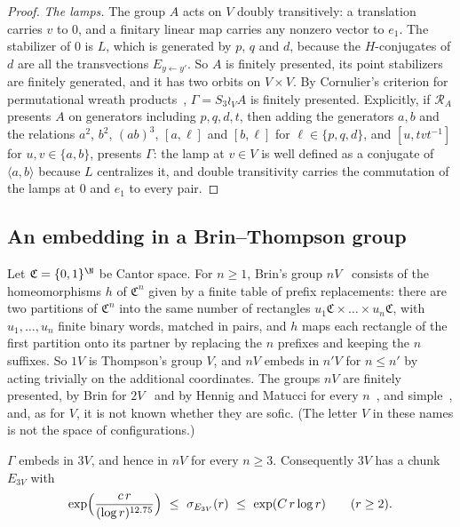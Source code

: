 \begin{proof}
\emph{The lamps.} The group $A$ acts on $V$ doubly transitively: a translation carries $v$ to $0$, and a finitary linear map carries any nonzero
vector to $e_1$. The stabilizer of $0$ is $L$, which is generated by $p$, $q$ and $d$, because the $H$-conjugates of $d$ are all the transvections
$E_{y\leftarrow y'}$. So $A$ is finitely presented, its point stabilizers are finitely generated, and it has two orbits on $V\times V$. By
Cornulier's criterion for permutational wreath products~\cite[Theorem~1.1]{Cornulier2006}, $\Gamma=S_3\wr_VA$ is finitely presented. Explicitly, if $\mathcal R_A$
presents $A$ on generators including $p,q,d,t$, then adding the generators $a,b$ and the relations $a^2$, $b^2$, $(ab)^3$, $[a,\ell]$ and $[b,\ell]$ for
$\ell\in\{p,q,d\}$, and $[u,tvt^{-1}]$ for $u,v\in\{a,b\}$, presents $\Gamma$: the lamp at $v\in V$ is well defined as a conjugate of
$\langle a,b\rangle$ because $L$ centralizes it, and double transitivity carries the commutation of the lamps at $0$ and $e_1$ to every pair.
\end{proof}

\subsection{An embedding in a Brin--Thompson group}\label{sec:3V}

Let $\mathfrak C=\{0,1\}^{\N}$ be Cantor space. For $n\ge1$, Brin's group $nV$~\cite{Brin2004} consists of the homeomorphisms $h$ of
$\mathfrak C^n$ given by a finite table of prefix replacements: there are two partitions of $\mathfrak C^n$ into the same number of rectangles
$u_1\mathfrak C\times\dots\times u_n\mathfrak C$, with $u_1,\dots,u_n$ finite binary words, matched in pairs, and $h$ maps each rectangle of the first
partition onto its partner by replacing the $n$ prefixes and keeping the $n$ suffixes. So $1V$ is Thompson's group $V$, and $nV$ embeds in $n'V$ for
$n\le n'$ by acting trivially on the additional coordinates. The groups $nV$ are finitely presented, by Brin for $2V$~\cite{Brin2005} and by
Hennig and Matucci for every $n$~\cite{HennigMatucci2012}, and simple~\cite{Brin2010}, and, as for $V$, it is not known whether they are sofic. (The letter $V$ in these names is not the space of configurations.)

\begin{proposition}\label{prop:3V}
$\Gamma$ embeds in $3V$, and hence in $nV$ for every $n\ge3$. Consequently $3V$ has a chunk $E_{3V}$ with
\[
\exp\Bigl(\frac{c\,r}{(\log r)^{12.75}}\Bigr)\ \le\ \sigma_{E_{3V}}(r)\ \le\ \exp(C\,r\log r)\qquad(r\ge2).
\]
\end{proposition}

